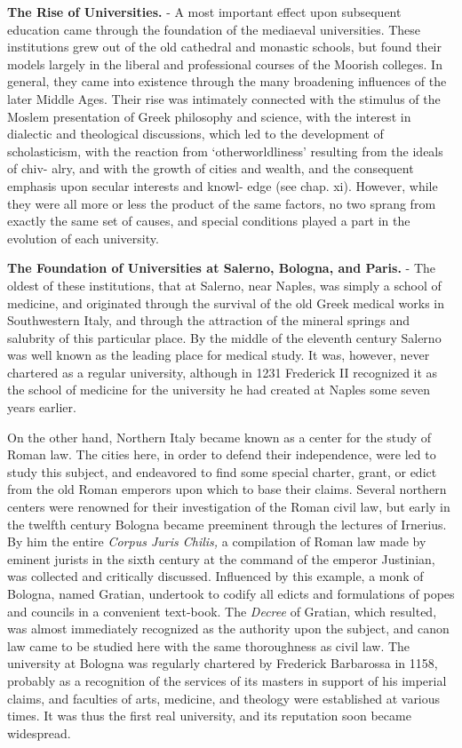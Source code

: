 \documentclass[]{book}
\begin{document}
\textbf{The Rise of Universities.} - A most important effect upon subsequent education came through the foundation of the mediaeval universities. These institutions grew out of the old cathedral and monastic schools, but found their models largely in the liberal and professional courses of the Moorish colleges. In general, they came into existence through the many broadening influences of the later Middle Ages. Their rise was intimately connected with the stimulus of the Moslem presentation of Greek philosophy and science, with the interest in dialectic and theological discussions, which led to the development of scholasticism, with the reaction from `otherworldliness' resulting from the ideals of chiv- alry, and with the growth of cities and wealth, and the consequent emphasis upon secular interests and knowl- edge (see chap. xi). However, while they were all more or less the product of the same factors, no two sprang from exactly the same set of causes, and special conditions played a part in the evolution of each university.

\textbf{The Foundation of Universities at Salerno, Bologna, and Paris.} - The oldest of these institutions, that at Salerno, near Naples, was simply a school of medicine, and originated through the survival of the old Greek medical works in Southwestern Italy, and through the attraction of the mineral springs and salubrity of this particular place. By the middle of the eleventh century Salerno was well known as the leading place for medical study. It was, however, never chartered as a regular university, although in 1231 Frederick II recognized it as the school of medicine for the university he had created at Naples some seven years earlier.

On the other hand, Northern Italy became known as a center for the study of Roman law. The cities here, in order to defend their independence, were led to study this subject, and endeavored to find some special charter, grant, or edict from the old Roman emperors upon which to base their claims. Several northern centers were renowned for their investigation of the Roman civil law, but early in the twelfth century Bologna became preeminent through the lectures of Irnerius. By him the entire \emph{Corpus Juris Chilis,} a compilation of Roman law made by eminent jurists in the sixth century at the command of the emperor Justinian, was collected and critically discussed. Influenced by this example, a monk of Bologna, named Gratian, undertook to codify all edicts and formulations of popes and councils in a convenient text-book. The \emph{Decree} of Gratian, which resulted, was almost immediately recognized as the authority upon the subject, and canon law came to be studied here with the same thoroughness as civil law. The university at Bologna was regularly chartered by Frederick Barbarossa in 1158, probably as a recognition of the services of its masters in support of his imperial claims, and faculties of arts, medicine, and theology were established at various times. It was thus the first real university, and its reputation soon became widespread.
\end{document}

